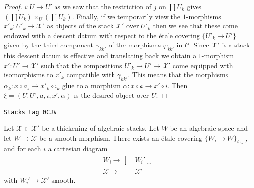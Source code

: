 \begin{proof}
$i : U \to U'$ as we saw that the restriction of $j$ on
$\coprod U_k$ gives $(\coprod U_k) \times_U (\coprod U_k)$.
Finally, if we temporarily view the $1$-morphisms
$x'_k : U'_k \to \mathcal{X}'$ as objects of the stack
$\mathcal{X}'$ over $U'_k$ then we see that these come endowed with a
descent datum with respect to the \'etale covering
$\{U'_k \to U'\}$ given by the third component $\gamma_{kk'}$
of the morphisms $\varphi_{kk'}$ in $\mathcal{C}$.
Since $\mathcal{X}'$ is a stack
this descent datum is effective and translating back we obtain
a $1$-morphism $x' : U' \to \mathcal{X}'$ such that the compositions
$U'_k \to U' \to \mathcal{X}'$ come equipped with isomorphisms to $x'_k$
compatible with $\gamma_{kk'}$. This means that the morphisms
$\alpha_k : x \circ a_k \to x'_k \circ i_k$ glue to a morphism
$\alpha : x \circ a \to x' \circ i$. Then $\xi = (U, U', a, i, x', \alpha)$
is the desired object over $U$.
\end{proof}

\begin{lemma}
\label{stacks-more-morphisms-lemma-etale-local-lifts}
\href{https://stacks.math.columbia.edu/tag/0CJV}{\texttt{Stacks tag 0CJV}}

Let $\mathcal{X} \subset \mathcal{X}'$ be a thickening of algebraic stacks.
Let $W$ be an algebraic space and let $W \to \mathcal{X}$ be a smooth morphism.
There exists an \'etale covering $\{W_i \to W\}_{i \in I}$ and for each $i$
a cartesian diagram
$$
\begin{array}{cc}W_i \longrightarrow\downarrow & W_i' \downarrow \\ \mathcal{X} \longrightarrow & \mathcal{X}'\end{array}
$$
with $W_i' \to \mathcal{X}'$ smooth.
\end{lemma}


